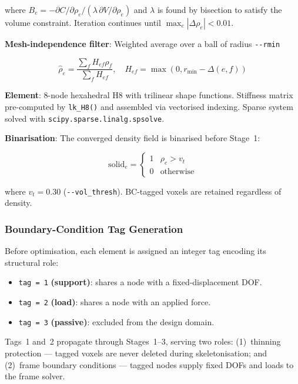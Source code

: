 \documentclass[a4paper, 11pt, openany]{report}
\begin{document}
where $B_e = -\partial C/\partial \rho_e / (\lambda\,\partial V/\partial \rho_e)$
and $\lambda$ is found by bisection to satisfy the volume constraint.
Iteration continues until $\max_e |\Delta\rho_e| < 0.01$.

\textbf{Mesh-independence filter}: Weighted average over a ball of radius
\texttt{-{}-rmin}

\begin{equation}
\label{eq:filter}
\hat{\rho}_e = \frac{\sum_{f} H_{ef} \rho_f}{\sum_f H_{ef}}, \quad
H_{ef} = \max(0, r_{\min} - \Delta(e,f))
\end{equation}

\textbf{Element}: 8-node hexahedral H8 with trilinear shape functions.
Stiffness matrix pre-computed by \texttt{lk\_H8()} and assembled via
vectorised indexing.  Sparse system solved with
\texttt{scipy.sparse.linalg.spsolve}.

\textbf{Binarisation}: The converged density field is binarised before Stage~1:

\begin{equation}
\label{eq:binarise}
\text{solid}_e =
\begin{cases}
1 & \rho_e > v_t \\
0 & \text{otherwise}
\end{cases}
\end{equation}

where $v_t = 0.30$ (\texttt{-{}-vol\_thresh}).  BC-tagged voxels are retained
regardless of density.

\subsubsection{Boundary-Condition Tag Generation}

Before optimisation, each element is assigned an integer tag encoding its
structural role:

\begin{itemize}[nosep]
    \item \texttt{tag = 1} \textbf{(support)}: shares a node with a
          fixed-displacement DOF.
    \item \texttt{tag = 2} \textbf{(load)}: shares a node with an applied force.
    \item \texttt{tag = 3} \textbf{(passive)}: excluded from the design domain.
\end{itemize}

Tags~1 and~2 propagate through Stages~1--3, serving two roles:
(1)~thinning protection --- tagged voxels are never deleted during
skeletonisation; and (2)~frame boundary conditions --- tagged nodes supply
fixed DOFs and loads to the frame solver.
\end{document}
